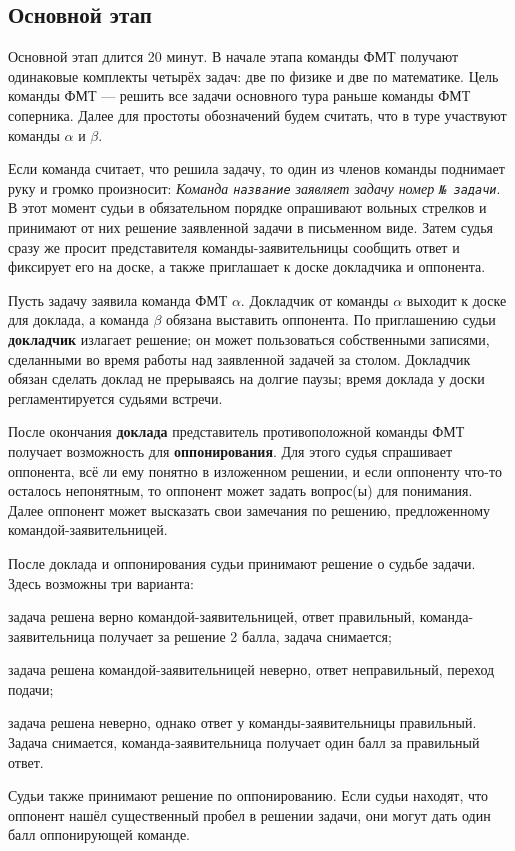 \documentclass[12pt,a4paper]{article}
\begin{document}
\subsection{Основной этап}
Основной этап длится 20 минут. В начале этапа команды ФМТ получают одинаковые комплекты четырёх задач: две по физике и две по математике. Цель команды ФМТ --- решить все задачи основного тура раньше команды ФМТ соперника. Далее для простоты обозначений будем считать, что в туре участвуют команды $\alpha$ и $\beta$.

Если команда считает, что решила задачу, то один из членов команды поднимает руку и громко произносит: \textsl{Команда \texttt{название} заявляет задачу номер \texttt{№ задачи}}. В этот момент судьи в обязательном порядке опрашивают вольных стрелков и принимают от них решение заявленной задачи в письменном виде. Затем судья сразу же просит представителя команды-заявительницы сообщить ответ и фиксирует его на доске, а также приглашает к доске докладчика и оппонента.

Пусть задачу заявила команда ФМТ $\alpha$. Докладчик от команды $\alpha$ выходит к доске для доклада, а команда $\beta$ обязана выставить оппонента. По приглашению судьи \textbf{докладчик} излагает решение; он может пользоваться собственными записями, сделанными во время работы над заявленной задачей за столом. Докладчик обязан сделать доклад не прерываясь на долгие паузы; время доклада у доски регламентируется судьями встречи.

После окончания \textbf{доклада} представитель противоположной команды ФМТ получает возможность для \textbf{оппонирования}. Для этого судья спрашивает оппонента, всё ли ему понятно в изложенном решении, и если оппоненту что-то осталось непонятным, то оппонент может задать вопрос(ы) для понимания. Далее оппонент может высказать свои замечания по решению, предложенному командой-заявительницей.

После доклада и оппонирования судьи принимают решение о судьбе задачи. Здесь возможны три варианта:
\begin{list}{--}{\leftmargin=10mm  \topsep=0mm  \itemsep=1pt \parsep=0mm \itemindent=-1.5pt}
\item задача решена верно командой-заявительницей, ответ правильный, команда-заявительница получает за решение 2 балла, задача снимается;
\item задача решена командой-заявительницей неверно, ответ неправильный, переход подачи;
\item задача решена неверно, однако ответ у команды-заявительницы правильный. Задача снимается, команда-заявительница получает один балл за правильный ответ.
\end{list}
Судьи также принимают решение по оппонированию. 
Если судьи находят, что оппонент нашёл существенный пробел в решении задачи, они могут дать один балл оппонирующей команде.
\end{document}
